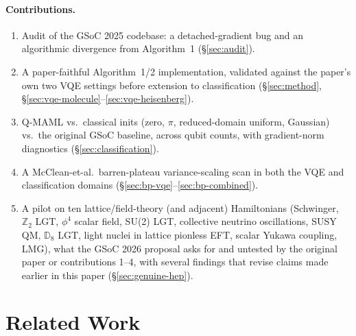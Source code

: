 \documentclass[11pt]{article}
\begin{document}
\paragraph{Contributions.}
\begin{enumerate}[nosep]
    \item Audit of the GSoC 2025 codebase: a detached-gradient bug and an algorithmic divergence from
    Algorithm~1 (\S\ref{sec:audit}).
    \item A paper-faithful Algorithm~1/2 implementation, validated against the paper's own two VQE settings
    before extension to classification (\S\ref{sec:method}, \S\ref{sec:vqe-molecule}--\ref{sec:vqe-heisenberg}).
    \item Q-MAML vs.\ classical inits (zero, $\pi$, reduced-domain uniform, Gaussian) vs.\ the original GSoC
    baseline, across qubit counts, with gradient-norm diagnostics (\S\ref{sec:classification}).
    \item A McClean-et-al.\ barren-plateau variance-scaling scan in both the VQE and classification domains
    (\S\ref{sec:bp-vqe}--\ref{sec:bp-combined}).
    \item A pilot on ten lattice/field-theory (and adjacent) Hamiltonians (Schwinger, $\mathbb{Z}_2$ LGT,
    $\phi^4$ scalar field, SU(2) LGT, collective neutrino oscillations, SUSY QM, $\mathbb{D}_8$ LGT, light
    nuclei in lattice pionless EFT, scalar Yukawa coupling, LMG), what
    the GSoC 2026 proposal asks for and untested by the original paper or contributions 1--4, with several
    findings that revise claims made earlier in this paper (\S\ref{sec:genuine-hep}).
\end{enumerate}

\section{Related Work}
\end{document}
